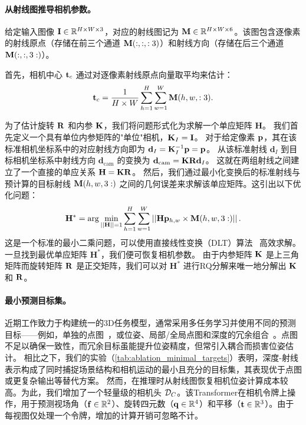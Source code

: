 \label{sec:ray2pose}
\paragraph{从射线图推导相机参数。}
给定输入图像 $\mathbf{I} \in \mathbb{R}^{H\times W \times 3}$，对应的射线图记为 $\mathbf{M} \in \mathbb{R}^{H \times W \times 6}$。该图包含逐像素的射线原点（存储在前三个通道 $\mathbf{M}(:,:,:3)$）和射线方向（存储在后三个通道 $\mathbf{M}(:,:,3:)$）。

首先，相机中心 $\mathbf{t}_c$ 通过对逐像素射线原点向量取平均来估计：
\begin{equation}
    \mathbf{t}_c = \frac{1}{H \times W} \sum_{h=1}^{H}\sum_{w=1}^W \mathbf{M}(h, w, :3).
\end{equation}

为了估计旋转 $\mathbf{R}$ 和内参 $\mathbf{K}$，我们将问题形式化为求解一个单应矩阵 $\mathbf{H}$。
我们首先定义一个具有单位内参矩阵的"单位"相机，$\mathbf{K}_I = \mathbf{I}$。
对于给定像素 $\mathbf{p}$，其在该标准相机坐标系中的对应射线方向即为 $\mathbf{d}_I = \mathbf{K}_I^{-1} \mathbf{p} = \mathbf{p}$。
从该标准射线 $\mathbf{d}_I$ 到目标相机坐标系中射线方向 $\mathbf{d}_\text{cam}$ 的变换为 $\mathbf{d}_\text{cam} = \mathbf{K} \mathbf{R} \mathbf{d}_I$。
这就在两组射线之间建立了一个直接的单应关系 $\mathbf{H} = \mathbf{K} \mathbf{R}$。
然后，我们通过最小化变换后的标准射线与预计算的目标射线 $\mathbf{M}(h,w,3:)$ 之间的几何误差来求解该单应矩阵。这引出以下优化问题：
\begin{equation}
    \mathbf{H}^* = \arg\min_{||\mathbf{H}|| = 1}\sum_{h=1}^{H}\sum_{w=1}^W \left|\left| \mathbf{H} \mathbf{p}_{h,w} \times \mathbf{M}(h,w,3:) \right|\right|.
\end{equation}
这是一个标准的最小二乘问题，可以使用直接线性变换（DLT）算法~\citep{abdel2015direct} 高效求解。
一旦找到最优单应矩阵 $\mathbf{H}^*$，我们便可恢复相机参数。
由于内参矩阵 $\mathbf{K}$ 是上三角矩阵而旋转矩阵 $\mathbf{R}$ 是正交矩阵，我们可以对 $\mathbf{H}^*$ 进行RQ分解来唯一地分解出 $\mathbf{K}$ 和 $\mathbf{R}$。

\paragraph{最小预测目标集。} 近期工作致力于构建统一的3D任务模型，通常采用多任务学习并使用不同的预测目标——例如，单独的点图~\citep{dust3r}，或位姿、局部/全局点图和深度的冗余组合~\citep{wang2025vggt,cut3r,fast3r}。点图不足以确保一致性，而冗余目标虽能提升位姿精度，但常引入耦合而损害位姿估计。
相比之下，我们的实验（\cref{tab:ablation_minimal_targets}）表明，深度-射线表示构成了同时捕捉场景结构和相机运动的最小且充分的目标集，其表现优于点图或更复杂输出等替代方案。
然而，在推理时从射线图恢复相机位姿计算成本较高。为此，我们增加了一个轻量级的相机头 $\mathcal{D}_C$。该Transformer在相机令牌上操作，用于预测视场角（$\mathbf{f} \in \mathbb{R}^2$）、旋转四元数（$\mathbf{q} \in \mathbb{R}^4$）和平移（$\mathbf{t} \in \mathbb{R}^3$）。由于每视图仅处理一个令牌，增加的计算开销可忽略不计。















